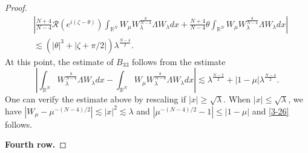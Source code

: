 \documentclass[a4paper,two-side,10pt]{amsart}
\newcommand{\R}{\mathbb{R}}
\numberwithin{equation}{section}
\begin{document}
\begin{proof}
\begin{align*}
&\left|  \frac{N+4}{N-4} \mathcal{R} \left(e^{i(\zeta -\theta)}\right) \int_{\R^N} W_\mu W_\lambda^{\frac{8}{N-4}} \Lambda W_\lambda dx + \frac{N+4}{N-4} \theta \int _{\R^N}W_\mu  W_\lambda^{\frac{8}{N-4}} \Lambda W_\lambda dx\right|\\
& \lesssim ( |\theta|^3 + |\zeta +\pi/2| ) \lambda^{\frac{N-4}{2}}. 
\end{align*}
At this point, the estimate of $B_{33}$ follows from the estimate
\begin{equation}\label{3-26}
\left|\int_{\R^N} W_\lambda^{\frac{8}{N-4}} \Lambda W_\lambda dx - \int_{\R^N} W_\mu W_\lambda^{\frac{8}{N-4}} \Lambda W_\lambda dx\right| \lesssim \lambda^{\frac{N-2}{2}} +|1-\mu| \lambda^{\frac{N-4}{2}}.
\end{equation}
One can verify the estimate above by rescaling if $|x|\geq \sqrt{\lambda}$. When $|x|\leq \sqrt{\lambda}$, we have $|W_\mu - \mu^{-(N-4)/2}|\lesssim |x|^2 \lesssim \lambda$ and $|\mu^{-(N-4)/2}-1 |\leq |1-\mu|$ and \eqref{3-26} follows.


{\bf Fourth row.} 


\end{proof}
\end{document}

